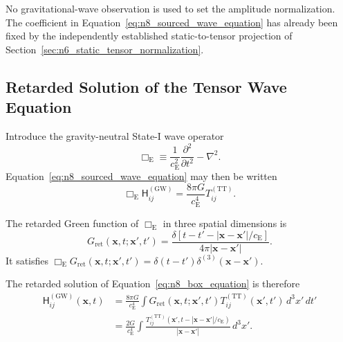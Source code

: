 No gravitational-wave observation is used to set the amplitude normalization. The coefficient in Equation~\eqref{eq:n8_sourced_wave_equation} has already been fixed by the independently established static-to-tensor projection of Section~\ref{sec:n6_static_tensor_normalization}.

\subsection{Retarded Solution of the Tensor Wave Equation}
\label{subsec:n8_retarded_solution}

Introduce the gravity-neutral State-I wave operator
\begin{equation}
    \Box_{\mathrm{E}} \equiv \frac{1}{c_{\mathrm{E}}^{2}} \frac{\partial^{2}}{\partial t^{2}} - \nabla^{2}.
\end{equation}
Equation~\eqref{eq:n8_sourced_wave_equation} may then be written
\begin{equation}
    \Box_{\mathrm{E}} \mathsf{H}_{ij}^{(\mathrm{GW})} = \frac{8\pi G}{c_{\mathrm{E}}^{4}} T_{ij}^{(\mathrm{TT})}.
    \label{eq:n8_box_equation}
\end{equation}

The retarded Green function of $\Box_{\mathrm{E}}$ in three spatial dimensions is
\begin{equation}
    G_{\mathrm{ret}} \left( \mathbf{x},t; \mathbf{x}',t' \right) = \frac{ \delta \left[ t-t' - |\mathbf{x}-\mathbf{x}'|/c_{\mathrm{E}} \right] }{ 4\pi|\mathbf{x}-\mathbf{x}'| }.
    \label{eq:n8_retarded_green}
\end{equation}
It satisfies $\Box_{\mathrm{E}} G_{\mathrm{ret}} \left( \mathbf{x},t; \mathbf{x}',t' \right) = \delta(t-t') \delta^{(3)} \left( \mathbf{x}-\mathbf{x}' \right)$.

The retarded solution of Equation~\eqref{eq:n8_box_equation} is therefore
\begin{equation}
    \begin{aligned}
        \mathsf{H}_{ij}^{(\mathrm{GW})}(\mathbf{x},t) &= \frac{8\pi G}{c_{\mathrm{E}}^{4}} \int G_{\mathrm{ret}} \left( \mathbf{x},t; \mathbf{x}',t' \right) T_{ij}^{(\mathrm{TT})} (\mathbf{x}',t') \,d^{3}x'\,dt' \\
        &= \frac{2G}{c_{\mathrm{E}}^{4}} \int \frac{ T_{ij}^{(\mathrm{TT})} \left( \mathbf{x}', t- |\mathbf{x}-\mathbf{x}'|/c_{\mathrm{E}} \right) }{ |\mathbf{x}-\mathbf{x}'| } \,d^{3}x'.
    \end{aligned}
    \label{eq:n8_exact_retarded_solution}
\end{equation}

